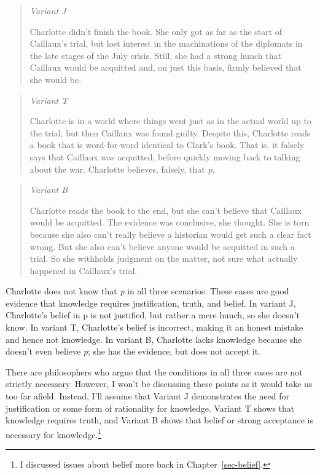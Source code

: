 \documentclass[
  12pt,
  letterpaper,
]{scrbook}
\begin{document}
\begin{quote}
\emph{Variant J}

Charlotte didn't finish the book. She only got as far as the start of
Caillaux's trial, but lost interest in the machinations of the diplomats
in the late stages of the July crisis. Still, she had a strong hunch
that Caillaux would be acquitted and, on just this basis, firmly
believed that she would be.
\end{quote}

\begin{quote}
\emph{Variant T}

Charlotte is in a world where things went just as in the actual world up
to the trial, but then Caillaux was found guilty. Despite this,
Charlotte reads a book that is word-for-word identical to Clark's book.
That is, it falsely says that Caillaux was acquitted, before quickly
moving back to talking about the war. Charlotte believes, falsely, that
\emph{p}.
\end{quote}

\begin{quote}
\emph{Variant B}

Charlotte reads the book to the end, but she can't believe that Caillaux
would be acquitted. The evidence was conclusive, she thought. She is
torn because she also can't really believe a historian would get such a
clear fact wrong. But she also can't believe anyone would be acquitted
in such a trial. So she withholds judgment on the matter, not sure what
actually happened in Caillaux's trial.
\end{quote}

Charlotte does not know that \emph{p} in all three scenarios. These
cases are good evidence that knowledge requires justification, truth,
and belief. In variant J, Charlotte's belief in p is not justified, but
rather a mere hunch, so she doesn't know. In variant T, Charlotte's
belief is incorrect, making it an honest mistake and hence not
knowledge. In variant B, Charlotte lacks knowledge because she doesn't
even believe \emph{p}; she has the evidence, but does not accept it.

There are philosophers who argue that the conditions in all three cases
are not strictly necessary. However, I won't be discussing these points
as it would take us too far afield. Instead, I'll assume that Variant J
demonstrates the need for justification or some form of rationality for
knowledge. Variant T shows that knowledge requires truth, and Variant B
shows that belief or strong acceptance is necessary for
knowledge.\footnote{I discussed issues about belief more back in
  Chapter~\ref{sec-belief}.}
\end{document}
